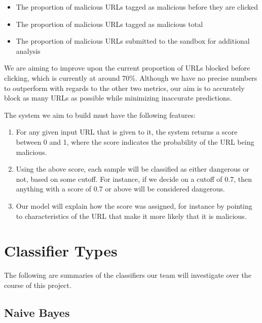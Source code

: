\documentclass[cs,proposal]{hmcclinic}
\begin{document}
\begin{itemize} \itemsep0em
\item The proportion of malicious URLs tagged as malicious before they are clicked
\item The proportion of malicious URLs tagged as malicious total
\item The proportion of malicious URLs submitted to the sandbox for additional analysis
\end{itemize}

We are aiming to improve upon the current proportion of URLs blocked before clicking, which is currently at around 70\%. Although we have no precise numbers to outperform with regards to the other two metrics, our aim is to accurately block as many URLs as possible while minimizing inaccurate predictions.

The system we aim to build must have the following features:

\begin{enumerate} \itemsep0em
\item For any given input URL that is given to it, the system returns a score between 0 and 1, where the score indicates the probability of the URL being malicious.
\item Using the above score, each sample will be classified as either dangerous or not, based on some cutoff. For instance, if we decide on a cutoff of 0.7, then anything with a score of 0.7 or above will be considered dangerous.
\item Our model will explain how the score was assigned, for instance by pointing to characteristics of the URL that make it more likely that it is malicious.
\end{enumerate}


\section{Classifier Types}

The following are summaries of the classifiers our team will investigate over the course of this project.

\subsection{Naive Bayes}
\end{document}
